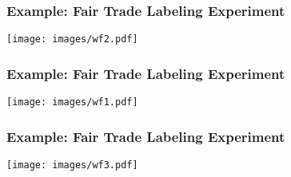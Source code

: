 \documentclass{beamer}
\numberwithin{equation}{section}
\begin{document}
%
%
%
%
%
%
%
%
%
%
%
%



\begin{frame}
  \frametitle{Example: Fair Trade Labeling Experiment}
  \centering
  \texttt{[image: images/wf2.pdf]}
\end{frame}

\begin{frame}
  \frametitle{Example: Fair Trade Labeling Experiment}
  \centering
  \texttt{[image: images/wf1.pdf]}
\end{frame}

\begin{frame}
  \frametitle{Example: Fair Trade Labeling Experiment}
  \centering
  \texttt{[image: images/wf3.pdf]}
\end{frame}
\end{document}
